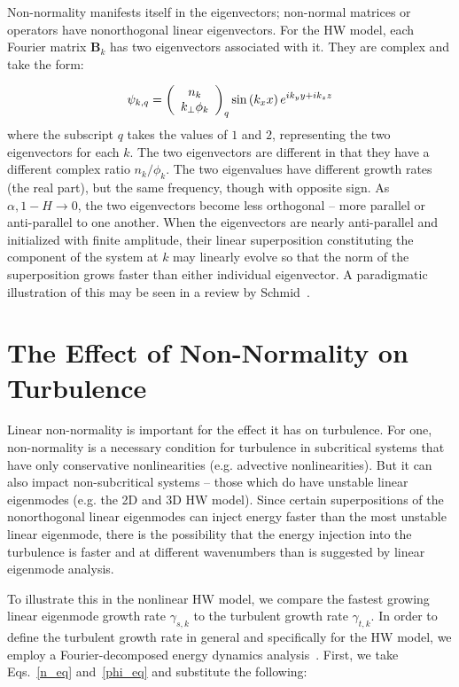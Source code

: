 \documentclass[twocolumn,showkeys,superscriptaddress]{revtex4}
\def\beq{\begin{equation}}
\def\eeq{\end{equation}}
\begin{document}
Non-normality manifests itself in the eigenvectors; non-normal matrices or operators have nonorthogonal linear eigenvectors. For the HW model, each Fourier matrix $\mathbf{B}_k$ has two eigenvectors associated
with it. They are complex and take the form:

\beq
\label{lin_eigen_form}
\psi_{k,q} = \left( \begin{array}{cc} n_k \\ k_\perp \phi_k \end{array} \right)_q {\rm sin} \left( k_x x \right) e^{i k_y y + i k_z z} 
\eeq
where the subscript $q$ takes the values of $1$ and $2$, representing the two eigenvectors for each $k$. The two eigenvectors are different in that they have a different complex ratio $n_k/\phi_k$.
The two eigenvalues have different growth rates (the real part), but the same frequency, though with opposite sign.
As $\alpha, 1-H \to 0$, the two eigenvectors become less orthogonal -- more parallel or anti-parallel to one another. When the eigenvectors are nearly anti-parallel and initialized with finite amplitude,
their linear superposition constituting the component of the system at $k$ may linearly evolve so that the norm of the superposition grows faster than either individual eigenvector. A paradigmatic illustration
of this may be seen in a review by Schmid~\cite{schmid2007}.

\section{The Effect of Non-Normality on Turbulence}
\label{sec_non_norm_turb}

Linear non-normality is important for the effect it has on turbulence. For one, non-normality is a necessary condition for turbulence in subcritical systems that have only conservative nonlinearities 
(e.g. advective nonlinearities). But it can also impact non-subcritical systems -- those which do have unstable linear eigenmodes (e.g. the 2D and 3D HW model). 
Since certain superpositions of the nonorthogonal linear eigenmodes can inject energy faster than the most unstable linear
eigenmode, there is the possibility that the energy injection into the turbulence is faster and at different wavenumbers than is suggested by linear eigenmode analysis. 

To illustrate this in the nonlinear HW model, we compare the fastest growing linear eigenmode growth rate $\gamma_{s,k}$ to the turbulent growth rate $\gamma_{t,k}$. 
In order to define the turbulent growth rate in general and specifically for the HW model, we employ a Fourier-decomposed energy dynamics analysis~\cite{camargo1995,friedman2012b,friedman2013}. 
First, we take Eqs.~\ref{n_eq} and~\ref{phi_eq} and substitute the following:
\end{document}
